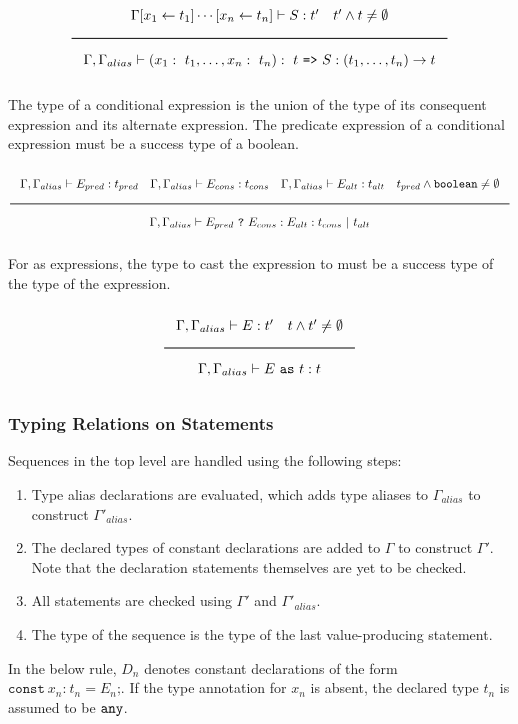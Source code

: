 \noindent
\[
  \Rule{\Gamma [x_1 \leftarrow t_1] \cdots [x_n \leftarrow t_n] \vdash S : t' \quad t' \wedge t \neq \emptyset}{
    \Gamma, \Gamma_{alias} \vdash (x_1:\ t_1, \ldots, x_n:\ t_n) :\ t\ \texttt{=>}\ S : (t_1, \ldots, t_n) \rightarrow t}  
\]
\noindent

The type of a conditional expression is the union of the type of its consequent expression and its alternate expression.
The predicate expression of a conditional expression must be a success type of a boolean.

\noindent
\[
  \Rule{\Gamma, \Gamma_{alias} \vdash E_{pred} : t_{pred} \quad \Gamma, \Gamma_{alias} \vdash E_{cons} : t_{cons} \quad \Gamma, \Gamma_{alias} \vdash E_{alt} : t_{alt}
    \quad t_{pred} \wedge \Bool \neq \emptyset}{\Gamma, \Gamma_{alias} \vdash E_{pred}\ \texttt{?}\ E_{cons} : E_{alt} : t_{cons}\ |\ t_{alt}}
\]
\noindent

For as expressions, the type to cast the expression to must be a success type of the type of the expression.

\noindent
\[
  \Rule{\Gamma, \Gamma_{alias} \vdash E : t' \quad t \wedge t' \neq \emptyset}{\Gamma, \Gamma_{alias} \vdash E\ \texttt{as}\ t : t}  
\]
\noindent

\subsubsection{Typing Relations on Statements}

Sequences in the top level are handled using the following steps:

\begin{enumerate}
\item{Type alias declarations are evaluated, which adds type aliases to $\Gamma_{alias}$ to construct $\Gamma'_{alias}$.}
\item{The declared types of constant declarations are added to $\Gamma$ to construct $\Gamma'$.
  Note that the declaration statements themselves are yet to be checked.}
\item{All statements are checked using $\Gamma'$ and $\Gamma'_{alias}$.}
\item{The type of the sequence is the type of the last value-producing statement.}
\end{enumerate}

In the below rule, $D_n$ denotes constant declarations of the form $\texttt{const}\ x_n \texttt{:}\ t_n = E_n\texttt{;}$.
If the type annotation for $x_n$ is absent, the declared type $t_n$ is assumed to be $\texttt{any}$.

